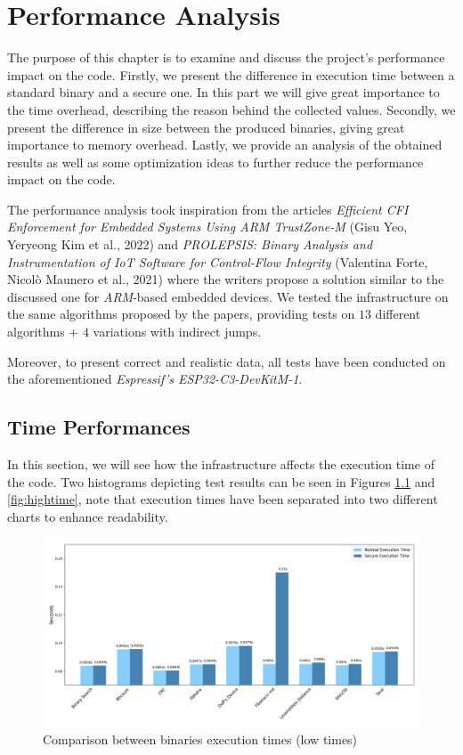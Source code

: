\chapter{Performance Analysis}
\label{cha:pa}

The purpose of this chapter is to examine and discuss the project's performance
impact on the code. Firstly, we present the difference in execution time between
a standard binary and a secure one. In this part we will give great importance to
the time overhead, describing the reason behind the collected values. Secondly,
we present the difference in size between the produced binaries, giving great importance
to memory overhead. Lastly, we provide an analysis of the obtained results as well
as some optimization ideas to further reduce the performance impact on the code.

The performance analysis took inspiration from the articles \textit{Efficient
CFI Enforcement for Embedded Systems Using ARM TrustZone-M}\cite{article1} (Gisu
Yeo, Yeryeong Kim et al., 2022) and \textit{PROLEPSIS: Binary Analysis and Instrumentation
of IoT Software for Control-Flow Integrity}\cite{article2} (Valentina Forte,
Nicol\`{o} Maunero et al., 2021) where the writers propose a solution similar to
the discussed one for \textit{ARM}-based embedded devices. We tested the infrastructure
on the same algorithms proposed by the papers, providing tests on $13$ different
algorithms + $4$ variations with indirect jumps.

Moreover, to present correct and realistic data, all tests have been conducted
on the aforementioned \textit{Espressif's ESP32-C3-DevKitM-1}.

\section{Time Performances}
\label{sec:pa_time}

In this section, we will see how the infrastructure affects the execution time of
the code. Two histograms depicting test results can be seen in Figures
\ref{fig:lowtime} and \ref{fig:hightime}, note that execution times have been separated
into two different charts to enhance readability.

\begin{figure}[htbp]
  \centering
  \includegraphics[width=\linewidth]{images/low_times.png}
  \caption{Comparison between binaries execution times (low times)}
  \label{fig:lowtime}
\end{figure}

